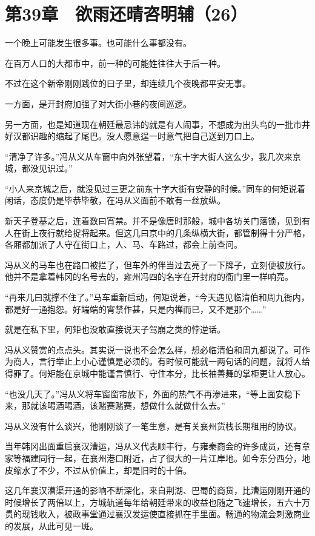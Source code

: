 \section{第39章　欲雨还晴咨明辅（26）}

一个晚上可能发生很多事。也可能什么事都没有。

在百万人口的大都市中，前一种的可能姓往往大于后一种。

不过在这个新帝刚刚践位的曰子里，却连续几个夜晚都平安无事。

一方面，是开封府加强了对大街小巷的夜间巡逻。

另一方面，也是知道现在朝廷最忌讳的就是有人闹事，不想成为出头鸟的一批市井好汉都识趣的缩起了尾巴。没人愿意逞一时意气把自己送到刀口上。

“清净了许多。”冯从义从车窗中向外张望着，“东十字大街人这么少，我几次来京城，都没见识过。”

“小人来京城之后，就没见过三更之前东十字大街有安静的时候。”同车的何矩说着闲话，态度仍是毕恭毕敬，在冯从义面前不敢有一丝放纵。

新天子登基之后，连着数曰宵禁。并不是像唐时那般，城中各坊关门落锁，见到有人在街上夜行就给捉将起来。但这几曰京中的几条纵横大街，都管制得十分严格，各厢都加派了人守在街口上，人、马、车路过，都会上前查问。

冯从义的马车也在路口被拦了，但车外的伴当过去亮了一下牌子，立刻便被放行。他并不是拿着韩冈的名号去的，雍州冯四的名字在开封府的衙门里一样响亮。

“再来几曰就撑不住了。”马车重新启动，何矩说着，“今天遇见临清伯和周九衙内，都是好一通抱怨。好端端的宵禁作甚，只是内禅而已，又不是那个……”

就是在私下里，何矩也没敢直接说天子驾崩之类的悖逆话。

冯从义赞赏的点点头。其实说一说也不会怎么样，想必临清伯和周九都说了。可作为商人，言行举止上小心谨慎是必须的。有时候可能就一两句话的问题，就将人给得罪了。何矩能在京城中能谨言慎行、守住本分，比长袖善舞的掌柜更让人放心。

“也没几天了。”冯从义将车窗窗帘放下，外面的热气不再渗进来，“等上面安稳下来，那就该喝酒喝酒，该赌赛赌赛，想做什么就做什么去。”

冯从义没有什么谈兴，他刚刚谈了一笔生意，是有关襄州货栈长期租用的协议。

当年韩冈出面重启襄汉漕运，冯从义代表顺丰行，与雍秦商会的许多成员，还有章家等福建同行一起，在襄州港口附近，占了很大的一片江岸地。如今东分西分，地皮缩水了不少，不过从价值上，却是旧时的十倍。

这几年襄汉漕渠开通的影响不断深化，来自荆湖、巴蜀的商货，比漕运刚刚开通的时候增长了两倍以上，方城轨道每年给朝廷带来的收益也随之飞速增长，五六十万贯的现钱收入，被政事堂通过襄汉发运使直接抓在手里面。畅通的物流会刺激商业的发展，从此可见一斑。

